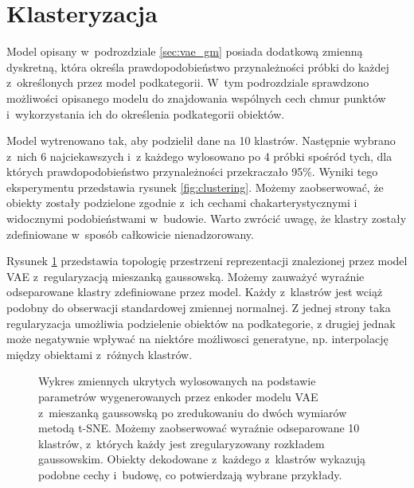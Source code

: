 \documentclass{iithesis}
\begin{document}
\section{Klasteryzacja}
Model opisany w~podrozdziale \ref{sec:vae_gm} posiada dodatkową zmienną dyskretną,
która określa prawdopodobieństwo przynależności próbki do każdej z~określonych
przez model podkategorii. W~tym podrozdziale sprawdzono możliwości opisanego
modelu do znajdowania wspólnych cech chmur punktów i~wykorzystania ich do
określenia podkategorii obiektów.

Model wytrenowano tak, aby podzielił dane na 10 klastrów.
Następnie wybrano z~nich 6 najciekawszych i~z każdego wylosowano po 4 próbki
spośród tych, dla których prawdopodobieństwo przynależności przekraczało 95\%.
Wyniki tego eksperymentu przedstawia rysunek \ref{fig:clustering}.
Możemy zaobserwować, że obiekty zostały podzielone zgodnie z~ich cechami chakarterystycznymi
i widocznymi podobieństwami w~budowie.
Warto zwrócić uwagę, że klastry zostały zdefiniowane w~sposób całkowicie nienadzorowany.

Rysunek \ref{fig:gm_means_tsne} przedstawia topologię przestrzeni reprezentacji
znalezionej przez model VAE z~regularyzacją mieszanką gaussowską.
Możemy zauważyć wyraźnie odseparowane klastry zdefiniowane przez model.
Każdy z~klastrów jest wciąż podobny do obserwacji standardowej zmiennej normalnej.
Z jednej strony taka regularyzacja umożliwia podzielenie obiektów na podkategorie,
z drugiej jednak może negatywnie wpływać na niektóre możliwosci generatyne,
np. interpolację między obiektami z~różnych klastrów.

\begin{figure}
    \caption{\label{fig:gm_means_tsne} Wykres zmiennych ukrytych wylosowanych na podstawie parametrów
    wygenerowanych przez enkoder modelu VAE z~mieszanką gaussowską po zredukowaniu do dwóch wymiarów metodą t-SNE.
    Możemy zaobserwować wyraźnie odseparowane 10 klastrów, z~których każdy jest zregularyzowany
    rozkładem gaussowskim. Obiekty dekodowane z~każdego z~klastrów wykazują podobne cechy i~budowę,
    co potwierdzają wybrane przykłady.}
\end{figure}
\end{document}
